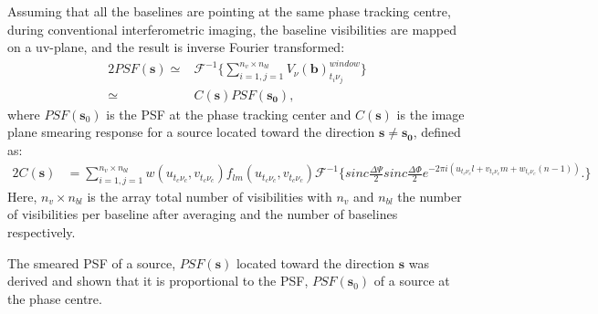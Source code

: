 Assuming that all the baselines are pointing at the same phase tracking centre, during conventional interferometric imaging,
the baseline visibilities are mapped on a uv-plane, and the result is inverse Fourier transformed:
\begin{alignat}{2}
PSF(\mathbf{s}) \simeq & \mathcal{F}^{-1}\Big\{\sum_{i=1,j=1}^{n_v\times n_{bl}}V_{\nu}(\mathbf{b})^{window}_{t_i \nu_j}\big\}\\
		\simeq & C(\mathbf{s})PSF(\mathbf{s_0}),
\end{alignat}
where $PSF(\mathbf{s}_0)$ is the PSF at the phase tracking center
and $C(\mathbf{s})$ is the image plane smearing response for a source
located toward the direction $\mathbf{s}\neq \mathbf{s_0}$, defined as:
\begin{alignat}{2}
C(\mathbf{s}) &= \sum_{i=1,j=1}^{n_v\times n_{bl}}w(u_{t_c\nu_c},v_{t_c\nu_c})f_{lm}(u_{t_c\nu_c},v_{t_c\nu_c})\mathcal{F}^{-1}\Bigg\{sinc\frac{\Delta \Psi}{2}sinc\frac{\Delta \Phi}{2}e^{-2\pi i (u_{t_c\nu_c}l+v_{t_c\nu_c}m+w_{t_c\nu_c}(n-1))}.\Bigg\}
\end{alignat}
Here, $n_v\times n_{bl}$ is the array total number of visibilities with $n_v$ and $n_{bl}$ the number of visibilities per 
baseline after averaging and the number of baselines respectively.


The smeared PSF of a source, $PSF(\mathbf{s})$ located toward the
direction $\mathbf{s}$ was derived and shown that it is proportional
to the PSF, $PSF(\mathbf{s}_0)$ of a source at the phase centre.
% 
